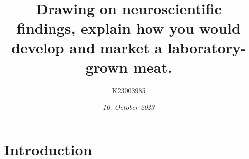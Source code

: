 \documentclass[10pt]{article}
\title{Drawing on neuroscientific findings, explain how you would develop and market a laboratory-grown meat.}
\author[ ]{K23003985}
\date{\textit{10. October 2023}}
\begin{document}

\maketitle


\begin{sloppypar} %





  \section{Introduction}
  \label{sec:introduction}


  \pagebreak
  \singlespacing %
  
  

\end{sloppypar}
\end{document}
